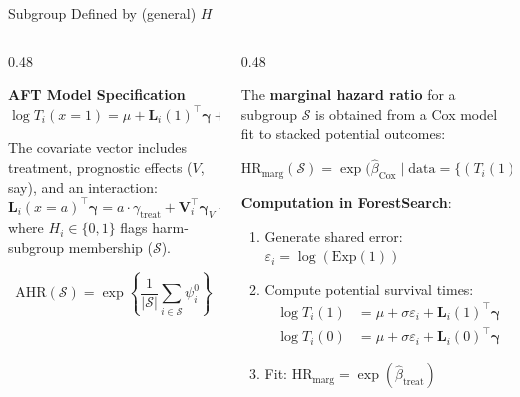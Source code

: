 \documentclass[
  ignorenonframetext,
  aspectratio=169]{beamer}
\begin{document}
\begin{frame}[shrink]{Subgroup Defined by (general) \(H\)}
\label{subgroup-defined-by-general-h}
\begin{columns}[T]
\begin{column}{0.48\textwidth}

\textbf{AFT Model Specification}
$\log T_i(x=1) = \mu + \mathbf{L}_i(1)^{\top} \boldsymbol{\gamma} + \tau\ \varepsilon_i$

The covariate vector includes treatment, prognostic effects ($V$, say), and an interaction:
$$\mathbf{L}_i(x=a)^{\top}\boldsymbol{\gamma} = a \cdot \gamma_{\text{treat}} + \mathbf{V}_i^{\top}\boldsymbol{\gamma}_V + a \cdot H_i \cdot \gamma_{\text{int}}$$
where $H_i \in \{0,1\}$ flags harm-subgroup membership ($\mathcal{S}$).

$$\text{AHR}(\mathcal{S}) = \exp\!\left\{\frac{1}{|\mathcal{S}|}\sum_{i \in \mathcal{S}} \psi_i^{0}\right\}$$

\end{column}

\begin{column}{0.48\textwidth}

The \textbf{marginal hazard ratio} for a subgroup $\mathcal{S}$ is obtained from a Cox model fit to stacked potential outcomes:

\begin{alertblock}

$\text{HR}_{\text{marg}}(\mathcal{S}) = \exp\!\bigl(\hat{\beta}_{\text{Cox}} \;\big|\; \text{data} = \{(T_i(1), 1, 1),\, (T_i(0), 1, 0) : i \in \mathcal{S}\}\bigr)$

\end{alertblock}

\textbf{Computation in ForestSearch}:
\begin{enumerate}
\item Generate shared error: $\varepsilon_i = \log(\text{Exp}(1))$
\item Compute potential survival times:
\begin{align*}
\log T_i(1) &= \mu + \sigma\varepsilon_i + \mathbf{L}_i(1)^{\top}\boldsymbol{\gamma} \\
\log T_i(0) &= \mu + \sigma\varepsilon_i + \mathbf{L}_i(0)^{\top}\boldsymbol{\gamma}
\end{align*}
\item Fit: $\text{HR}_{\text{marg}} = \exp(\hat{\beta}_{\text{treat}})$
\end{enumerate}

\end{column}
\end{columns}
\end{frame}
\end{document}
